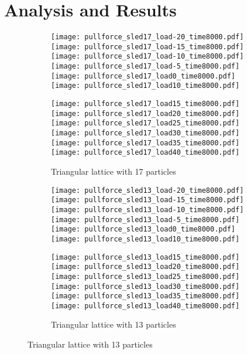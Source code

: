 \documentclass[12pt]{amsart}
\begin{document}
\section{Analysis and Results}

\begin{figure}[h]
\begin{subfigure}{\textwidth}
\texttt{[image: pullforce\_sled17\_load-20\_time8000.pdf]}
\texttt{[image: pullforce\_sled17\_load-15\_time8000.pdf]}
\texttt{[image: pullforce\_sled17\_load-10\_time8000.pdf]}
\texttt{[image: pullforce\_sled17\_load-5\_time8000.pdf]}
\texttt{[image: pullforce\_sled17\_load0\_time8000.pdf]}
\texttt{[image: pullforce\_sled17\_load10\_time8000.pdf]}

\texttt{[image: pullforce\_sled17\_load15\_time8000.pdf]}
\texttt{[image: pullforce\_sled17\_load20\_time8000.pdf]}
\texttt{[image: pullforce\_sled17\_load25\_time8000.pdf]}
\texttt{[image: pullforce\_sled17\_load30\_time8000.pdf]}
\texttt{[image: pullforce\_sled17\_load35\_time8000.pdf]}
\texttt{[image: pullforce\_sled17\_load40\_time8000.pdf]}
\caption{ Triangular lattice with 17 particles } 
\end{subfigure}

\begin{subfigure}{\textwidth}
\texttt{[image: pullforce\_sled13\_load-20\_time8000.pdf]}
\texttt{[image: pullforce\_sled13\_load-15\_time8000.pdf]}
\texttt{[image: pullforce\_sled13\_load-10\_time8000.pdf]}
\texttt{[image: pullforce\_sled13\_load-5\_time8000.pdf]}
\texttt{[image: pullforce\_sled13\_load0\_time8000.pdf]}
\texttt{[image: pullforce\_sled13\_load10\_time8000.pdf]}

\texttt{[image: pullforce\_sled13\_load15\_time8000.pdf]}
\texttt{[image: pullforce\_sled13\_load20\_time8000.pdf]}
\texttt{[image: pullforce\_sled13\_load25\_time8000.pdf]}
\texttt{[image: pullforce\_sled13\_load30\_time8000.pdf]}
\texttt{[image: pullforce\_sled13\_load35\_time8000.pdf]}
\texttt{[image: pullforce\_sled13\_load40\_time8000.pdf]}
\caption{ Triangular lattice with 13 particles } 
\end{subfigure}



\end{figure}
\end{document}
